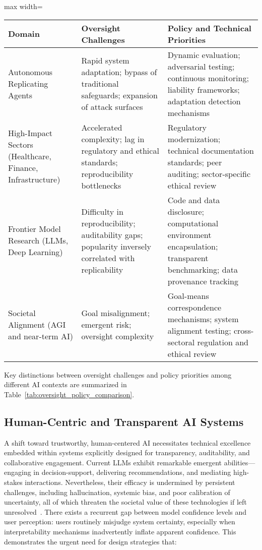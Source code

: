 \documentclass[sigconf]{acmart}
\begin{document}
\begin{table*}[htbp]
\centering
\caption{Comparison of Oversight Challenges and Policy Priorities in AI Deployment}
\label{tab:oversight_policy_comparison}
\begin{adjustbox}{max width=\textwidth}
\begin{tabular}{lll}
\toprule
\textbf{Domain} & \textbf{Oversight Challenges} & \textbf{Policy and Technical Priorities} \\
\midrule
Autonomous Replicating Agents & Rapid system adaptation; bypass of traditional safeguards; expansion of attack surfaces & Dynamic evaluation; adversarial testing; continuous monitoring; liability frameworks; adaptation detection mechanisms \\
High-Impact Sectors (Healthcare, Finance, Infrastructure) & Accelerated complexity; lag in regulatory and ethical standards; reproducibility bottlenecks & Regulatory modernization; technical documentation standards; peer auditing; sector-specific ethical review \\
Frontier Model Research (LLMs, Deep Learning) & Difficulty in reproducibility; auditability gaps; popularity inversely correlated with replicability & Code and data disclosure; computational environment encapsulation; transparent benchmarking; data provenance tracking \\
Societal Alignment (AGI and near-term AI) & Goal misalignment; emergent risk; oversight complexity & Goal-means correspondence mechanisms; system alignment testing; cross-sectoral regulation and ethical review  \\
\bottomrule
\end{tabular}
\end{adjustbox}
\end{table*}

Key distinctions between oversight challenges and policy priorities among different AI contexts are summarized in Table~\ref{tab:oversight_policy_comparison}.

\subsection{Human-Centric and Transparent AI Systems}

A shift toward trustworthy, human-centered AI necessitates technical excellence embedded within systems explicitly designed for transparency, auditability, and collaborative engagement. Current LLMs exhibit remarkable emergent abilities—engaging in decision-support, delivering recommendations, and mediating high-stakes interactions. Nevertheless, their efficacy is undermined by persistent challenges, including hallucination, systemic bias, and poor calibration of uncertainty, all of which threaten the societal value of these technologies if left unresolved~\cite{ref35,ref39,ref42,ref46}. There exists a recurrent gap between model confidence levels and user perception: users routinely misjudge system certainty, especially when interpretability mechanisms inadvertently inflate apparent confidence. This demonstrates the urgent need for design strategies that:
\end{document}
